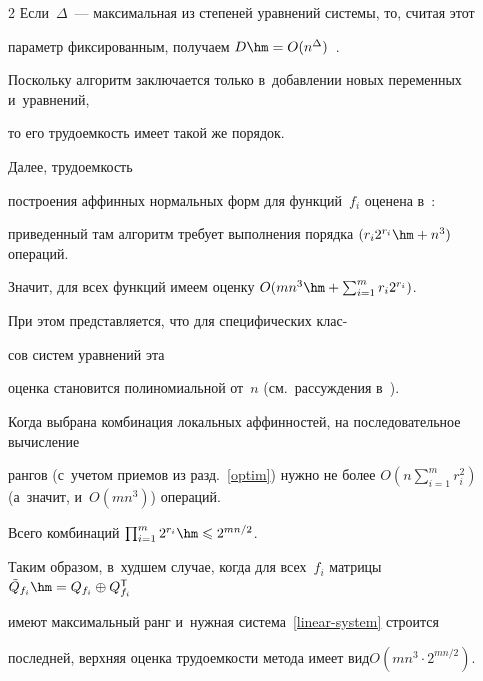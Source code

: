 \begin{multicols}{2}
Если~$\Delta$~--- максимальная из степеней уравнений системы, то, считая этот 


параметр фиксированным, получаем $D\hm=O(n^{\Delta})$~\cite[\S{}.6]{Bard2009}. 


Поскольку алгоритм заключается только в~добавлении новых переменных и~уравнений, 


то его трудоемкость имеет такой же порядок.





Далее, трудоемкость


построения аффинных нормальных форм для функций~$f_i$ оценена в~\cite{LSF2019}: 


приведенный там алгоритм требует выполнения порядка $(r_i2^{r_i}\hm+ n^3)$ операций. 


Значит, для всех функций имеем оценку $O(mn^3\hm+\sum\nolimits_{i=1}^m r_i2^{r_i})$. 


При этом представляется, что для специфических клас-\linebreak\vspace*{-12pt}





\columnbreak





\noindent


сов систем уравнений эта 


оценка становится полиномиальной от~$n$ (см.\ рассуждения в~\cite{LSF2019}).





Когда выбрана комбинация локальных аффинностей, на последовательное вычисление 


рангов (с~учетом приемов из разд.~\ref{optim}) нужно не более $O(n\sum\nolimits_{i=1}^m 


r_i^2)$ (а~значит, и~$O(mn^3)$) операций.


Всего комбинаций $\prod\nolimits_{i=1}^m 2^{r_i}\hm\leqslant 2^{{mn}/{2}}$.





Таким образом, в~худшем случае, когда для всех~$f_i$ матрицы~$\tilde{Q}_{f_i}\hm=


Q_{f_i}\oplus Q_{f_i}^{\mathsf{T}}$ 


имеют максимальный ранг и~нужная система~\eqref{linear-system} строится 


последней, верхняя оценка трудоемкости метода имеет вид\linebreak $O(mn^3\cdot 2^{{mn}/{2}})$.



\end{multicols}
